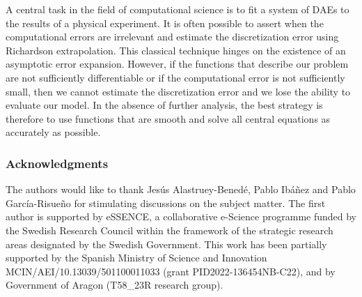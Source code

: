 \documentclass[runningheads]{llncs}
\begin{document}
A central task in the field of computational science is to fit a system of DAEs to the results of a physical experiment. It is often possible to assert when the computational errors are irrelevant and estimate the discretization error using Richardson extrapolation. This classical technique hinges on the existence of an asymptotic error expansion. However, if the functions that describe our problem are not sufficiently differentiable or if the computational error is not sufficiently small, then we cannot estimate the discretization error and we lose the ability to evaluate our model. In the absence of further analysis, the best strategy is therefore to use functions that are smooth and solve all central equations as accurately as possible.

\subsubsection{Acknowledgments}

The authors would like to thank Jesús Alastruey-Benedé, Pablo Ibáñez and Pablo García-Risueño for stimulating discussions on the subject matter.
The first author is supported by eSSENCE, a collaborative e-Science programme funded by the Swedish Research Council within the framework of the strategic research areas designated by the Swedish Government.
This work has been partially supported by the Spanish Ministry of Science and Innovation MCIN/AEI/10.13039/501100011033 (grant PID2022-136454NB-C22), and by Government of Aragon (T58\_23R research group).

%
%
%


 
\end{document}
